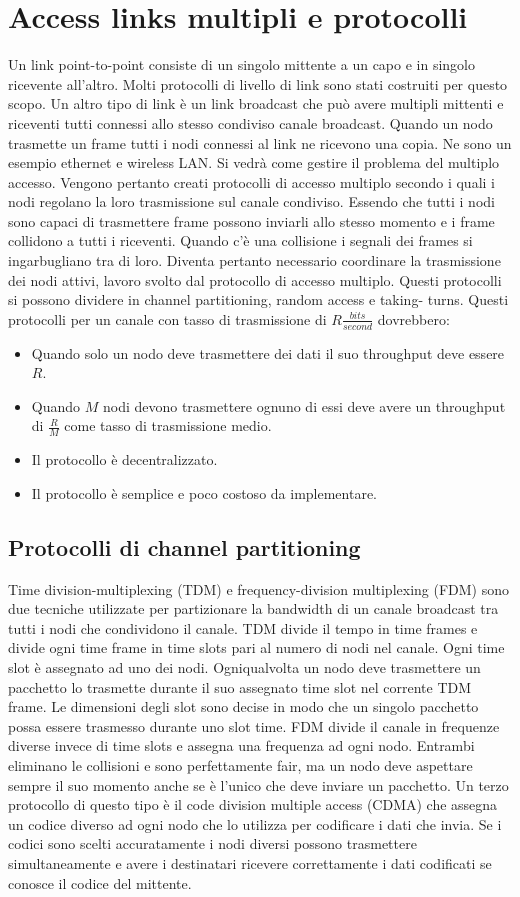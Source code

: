 \section{Access links multipli e protocolli}
Un link point-to-point consiste di un singolo mittente a un capo e in singolo ricevente all'altro. Molti protocolli di livello di link sono stati costruiti per questo scopo. Un altro tipo di link \`e un link broadcast che 
pu\`o avere multipli mittenti e riceventi tutti connessi allo stesso condiviso canale broadcast. Quando un nodo trasmette un frame tutti i nodi connessi al link ne ricevono una copia. Ne sono un esempio 
ethernet e wireless LAN. Si vedr\`a come gestire il problema del multiplo accesso. Vengono pertanto creati protocolli di accesso multiplo secondo i quali i nodi regolano la loro trasmissione sul canale condiviso.
Essendo che tutti i nodi sono capaci di trasmettere frame possono inviarli allo stesso momento e i frame collidono a tutti i riceventi. Quando c'\`e una collisione i segnali dei frames si ingarbugliano tra di loro. 
Diventa pertanto necessario coordinare la trasmissione dei nodi attivi, lavoro svolto dal protocollo di accesso multiplo. Questi protocolli si possono dividere in channel partitioning, random access e taking-
turns. Questi protocolli per un canale con tasso di trasmissione di $R\frac{bits}{second}$ dovrebbero:
\begin{itemize}
\item Quando solo un nodo deve trasmettere dei dati il suo throughput deve essere $R$.
\item Quando $M$ nodi devono trasmettere ognuno di essi deve avere un throughput di $\frac{R}{M}$ come tasso di trasmissione medio.
\item Il protocollo \`e decentralizzato.
\item Il protocollo \`e semplice e poco costoso da implementare.
\end{itemize}
\subsection{Protocolli di channel partitioning}
Time division-multiplexing (TDM) e frequency-division multiplexing (FDM) sono due tecniche utilizzate per partizionare la bandwidth di un canale broadcast tra tutti i nodi che condividono il canale. TDM divide
il tempo in time frames e divide ogni time frame in time slots pari al numero di nodi nel canale. Ogni time slot \`e assegnato ad uno dei nodi. Ogniqualvolta un nodo deve trasmettere un pacchetto lo trasmette
durante il suo assegnato time slot nel corrente TDM frame. Le dimensioni degli slot sono decise in modo che un singolo pacchetto possa essere trasmesso durante uno slot time.   FDM divide il canale in 
frequenze diverse invece di time slots e assegna una frequenza ad ogni nodo. Entrambi eliminano le collisioni e sono perfettamente fair, ma un nodo deve aspettare sempre il suo momento anche se \`e l'unico 
che deve inviare un pacchetto. Un terzo protocollo di questo tipo \`e il code division multiple access (CDMA) che assegna un codice diverso ad ogni nodo che lo utilizza per codificare i dati che invia. Se i codici
sono scelti accuratamente i nodi diversi possono trasmettere simultaneamente e avere i destinatari ricevere correttamente i dati codificati se conosce il codice del mittente. 
